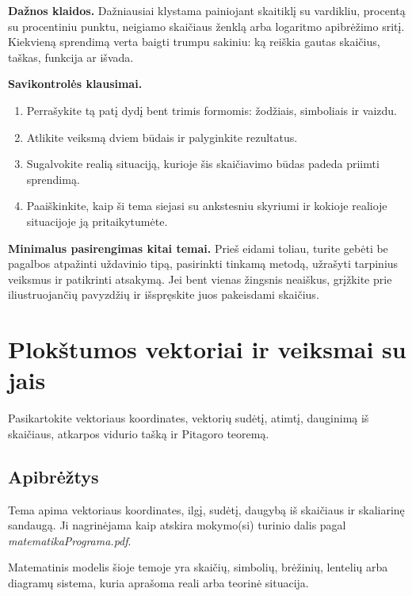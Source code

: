 \textbf{Dažnos klaidos.} Dažniausiai klystama painiojant skaitiklį su vardikliu, procentą su procentiniu punktu, neigiamo skaičiaus ženklą arba logaritmo apibrėžimo sritį. Kiekvieną sprendimą verta baigti trumpu sakiniu: ką reiškia gautas skaičius, taškas, funkcija ar išvada.

\textbf{Savikontrolės klausimai.}
\begin{enumerate}[label=\arabic*.]
\item Perrašykite tą patį dydį bent trimis formomis: žodžiais, simboliais ir vaizdu.
\item Atlikite veiksmą dviem būdais ir palyginkite rezultatus.
\item Sugalvokite realią situaciją, kurioje šis skaičiavimo būdas padeda priimti sprendimą.
\item Paaiškinkite, kaip ši tema siejasi su ankstesniu skyriumi ir kokioje realioje situacijoje ją pritaikytumėte.
\end{enumerate}

\textbf{Minimalus pasirengimas kitai temai.} Prieš eidami toliau, turite gebėti be pagalbos atpažinti uždavinio tipą, pasirinkti tinkamą metodą, užrašyti tarpinius veiksmus ir patikrinti atsakymą. Jei bent vienas žingsnis neaiškus, grįžkite prie iliustruojančių pavyzdžių ir išspręskite juos pakeisdami skaičius.

\section{Plokštumos vektoriai ir veiksmai su jais}\label{sec:plokstumos-vektoriai-ir-veiksmai-su-jais}

\begin{tcolorbox}[title=Prieš pradedant, colback=green!5]
Pasikartokite vektoriaus koordinates, vektorių sudėtį, atimtį, dauginimą iš skaičiaus, atkarpos vidurio tašką ir Pitagoro teoremą.
\end{tcolorbox}
\subsection{Apibrėžtys}
\begin{apibreztis}
Tema apima vektoriaus koordinates, ilgį, sudėtį, daugybą iš skaičiaus ir skaliarinę sandaugą. Ji nagrinėjama kaip atskira mokymo(si) turinio dalis pagal \emph{matematikaPrograma.pdf}.
\end{apibreztis}
\begin{apibreztis}
Matematinis modelis šioje temoje yra skaičių, simbolių, brėžinių, lentelių arba diagramų sistema, kuria aprašoma reali arba teorinė situacija.
\end{apibreztis}

